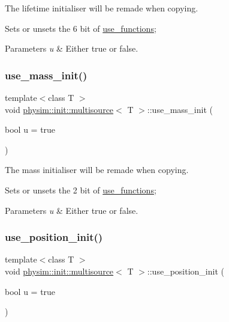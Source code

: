 The lifetime initialiser will be remade when copying. 

Sets or unsets the 6 bit of \hyperlink{classphysim_1_1init_1_1multisource_a12caae3f36b17cd343065aab62b62a8c}{use\+\_\+functions}; 
\begin{DoxyParams}{Parameters}
{\em u} & Either true or false. \\
\hline
\end{DoxyParams}
\mbox{\label{classphysim_1_1init_1_1multisource_aa61a8925f6363b01e40f37aea40ba730}} 
\subsubsection{\texorpdfstring{use\+\_\+mass\+\_\+init()}{use\_mass\_init()}}
{\footnotesize\ttfamily template$<$class T $>$ \\
void \hyperlink{classphysim_1_1init_1_1multisource}{physim\+::init\+::multisource}$<$ T $>$\+::use\+\_\+mass\+\_\+init (\begin{DoxyParamCaption}\item[{bool}]{u = {\ttfamily true} }\end{DoxyParamCaption})}



The mass initialiser will be remade when copying. 

Sets or unsets the 2 bit of \hyperlink{classphysim_1_1init_1_1multisource_a12caae3f36b17cd343065aab62b62a8c}{use\+\_\+functions}; 
\begin{DoxyParams}{Parameters}
{\em u} & Either true or false. \\
\hline
\end{DoxyParams}
\mbox{\label{classphysim_1_1init_1_1multisource_a9fb693b4587cac0bd27ad96fc00fc325}} 
\subsubsection{\texorpdfstring{use\+\_\+position\+\_\+init()}{use\_position\_init()}}
{\footnotesize\ttfamily template$<$class T $>$ \\
void \hyperlink{classphysim_1_1init_1_1multisource}{physim\+::init\+::multisource}$<$ T $>$\+::use\+\_\+position\+\_\+init (\begin{DoxyParamCaption}\item[{bool}]{u = {\ttfamily true} }\end{DoxyParamCaption})}



